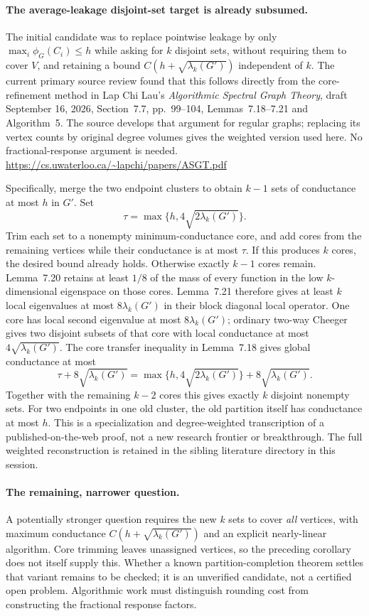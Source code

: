 \documentclass[11pt]{article}
\begin{document}
\paragraph{The average-leakage disjoint-set target is already subsumed.}
The initial candidate was to replace pointwise leakage by only
$\max_i\phi_G(C_i)\le h$ while asking for $k$ disjoint sets, without
requiring them to cover $V$, and retaining a bound
$C(h+\sqrt{\lambda_k(G')})$ independent of $k$.
The current primary source review found that this follows directly from
the core-refinement method in Lap Chi Lau's
\emph{Algorithmic Spectral Graph Theory}, draft September 16, 2026,
Section~7.7, pp.~99--104, Lemmas~7.18--7.21 and Algorithm~5.
The source develops that argument for regular graphs; replacing its
vertex counts by original degree volumes gives the weighted version
used here. No fractional-response argument is needed.
\url{https://cs.uwaterloo.ca/~lapchi/papers/ASGT.pdf}

Specifically, merge the two endpoint clusters to obtain $k-1$ sets
of conductance at most $h$ in $G'$. Set
\[
 \tau=\max\{h,4\sqrt{2\lambda_k(G')}\}.
\]
Trim each set to a nonempty minimum-conductance core, and add cores
from the remaining vertices while their conductance is at most $\tau$.
If this produces $k$ cores, the desired bound already holds. Otherwise
exactly $k-1$ cores remain. Lemma~7.20 retains at least $1/8$ of the
mass of every function in the low $k$-dimensional eigenspace on those
cores. Lemma~7.21 therefore gives at least $k$ local eigenvalues at most
$8\lambda_k(G')$ in their block diagonal local operator. One core has
local second eigenvalue at most $8\lambda_k(G')$; ordinary two-way
Cheeger gives two disjoint subsets of that core with local conductance
at most $4\sqrt{\lambda_k(G')}$. The core transfer inequality in
Lemma~7.18 gives global conductance at most
\[
 \boxed{\displaystyle
 \tau+8\sqrt{\lambda_k(G')}
 =\max\{h,4\sqrt{2\lambda_k(G')}\}
   +8\sqrt{\lambda_k(G')}.}
\]
Together with the remaining $k-2$ cores this gives exactly $k$
disjoint nonempty sets. For two endpoints in one old cluster, the old
partition itself has conductance at most $h$.
This is a specialization and degree-weighted transcription of a
published-on-the-web proof, not a new research frontier or breakthrough.
The full weighted reconstruction is retained in the sibling literature
directory in this session.

\paragraph{The remaining, narrower question.}
A potentially stronger question requires the new $k$ sets to cover
\emph{all} vertices, with maximum conductance
$C(h+\sqrt{\lambda_k(G')})$ and an explicit nearly-linear algorithm.
Core trimming leaves unassigned vertices, so the preceding corollary
does not itself supply this. Whether a known partition-completion theorem
settles that variant remains to be checked; it is an unverified candidate,
not a certified open problem. Algorithmic work must distinguish rounding
cost from constructing the fractional response factors.
\end{document}

